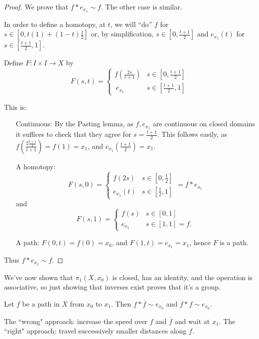 \begin{proof} 
We prove that $f* e_{x_1}\sim f$.  The other case is similar.

In order to define a homotopy, at $t$, we will ``do'' $f$ for $s\in [0,t(1)+(1-t)\tfrac{1}{2}]$ or, by simplification, $s\in[0,\tfrac{t+1}{2}]$ and $e_{x_1}(t)$ for $s\in [\tfrac{t+1}{2},1]$.

Define $F:I\times I \to X$ by 
\[F(s,t)=\begin{cases} f\left(\tfrac{2s}{t+1}\right) & s\in \left[0,\tfrac{t+1}{2}\right] \\\
				 e_{x_1} & s\in \left[\frac{t+1}{2},1\right]
	    \end{cases}\]

This is:
\begin{itemize}
\item[Continuous:]
By the Pasting lemma, as $f, e_{x_1}$ are continuous on closed domains it suffices to check that they agree for $s=\tfrac{t+1}{2}$.  This follows easily, as $f\left(\frac{2\tfrac{t+1}{2}}{t+1}\right)=f(1)=x_1$, and $e_{x_1}\left(\tfrac{t+1}{2}\right)=x_1$. 
\item[A homotopy:]
\[F(s,0)=\begin{cases}f(2s) & s\in\left[0,\tfrac{1}{2}\right]\\ e_{x_1}(t) & s\in\left[\tfrac{1}{2},1\right]\end{cases} = f*e_{x_1}\]
and
\[F(s,1)=\begin{cases} f(s) & s\in [0,1]\\ e_{x_1} & s\in [1,1]=f.\end{cases}\]
\item[ A path: ]
$F(0,t)=f(0)=x_0$, and $F(1,t)=e_{x_1}=x_1$, hence $F$ is a path.
\end{itemize}
Thus $f*e_{x_1}\sim f$.
\end{proof}

We've now shown that $\pi_1(X, x_0)$ is closed, has an identity, and the operation is associative, so just showing that inverses exist proves that it's a group.

\begin{lemma}[Inverses]
 Let $f$ be a path in $X$ from $x_0$ to $x_1$.  Then $f*\overline{f}\sim e_{x_0}$ and $\overline{f}*f\sim e_{x_0}$.
 \end{lemma}

The ``wrong" approach:  increase the speed over $f$ and $\overline{f}$ and wait at $x_1$.
The ``right" approach: travel successively smaller distances along $f$.



